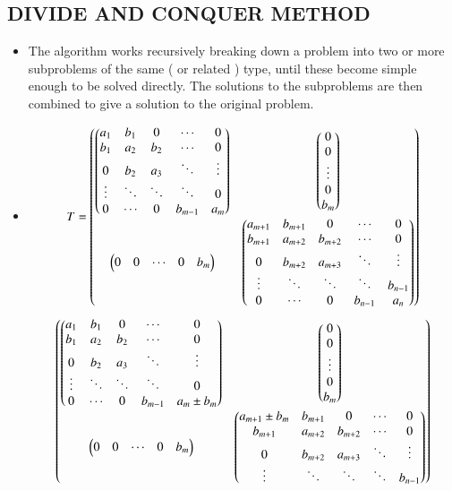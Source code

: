 \documentclass[report,12pt,onecolumn]{IEEEtran}
\theoremstyle{remark}
\begin{document}
\begin{itemize}
		\section{DIVIDE AND CONQUER METHOD}
		\begin{itemize}
			\item The algorithm works recursively breaking down a problem into two or more subproblems of the same ( or related ) type, until these become simple enough to be solved directly. The solutions to the subproblems are then combined to give a solution to the original problem.
			\item $$ T = \begin{pmatrix}\begin{pmatrix}a_1 & b_1 & 0 & \cdots & 0 \\
b_1 & a_2 & b_2 & \cdots & 0 \\
0 & b_2 & a_3 & \ddots & \vdots \\
\vdots & \ddots & \ddots & \ddots & 0 \\
				0 & \cdots & 0 & b_{m-1} & a_m\end{pmatrix} & \begin{pmatrix}0 \\ 0 \\ \vdots \\ 0 \\ b_m\end{pmatrix} \\ \begin{pmatrix}0 & 0 & \cdots & 0 & b_m\end{pmatrix} & \begin{pmatrix}a_{m+1} & b_{m+1} & 0 & \cdots & 0 \\
b_{m+1} & a_{m+2} & b_{m+2} & \cdots & 0 \\
0 & b_{m+2} & a_{m+3} & \ddots & \vdots \\
\vdots & \ddots & \ddots & \ddots & b_{n-1} \\
				0 & \cdots & 0 & b_{n-1} & a_n\end{pmatrix}\end{pmatrix} $$
				$$ \begin{pmatrix}\begin{pmatrix}a_1 & b_1 & 0 & \cdots & 0 \\
b_1 & a_2 & b_2 & \cdots & 0 \\
0 & b_2 & a_3 & \ddots & \vdots \\
\vdots & \ddots & \ddots & \ddots & 0 \\
				0 & \cdots & 0 & b_{m-1} & a_m \pm b_m\end{pmatrix} & \begin{pmatrix}0 \\ 0 \\ \vdots \\ 0 \\ b_m\end{pmatrix} \\ \begin{pmatrix}0 & 0 & \cdots & 0 & b_m\end{pmatrix} & \begin{pmatrix}a_{m+1} \pm b_m & b_{m+1} & 0 & \cdots & 0 \\
b_{m+1} & a_{m+2} & b_{m+2} & \cdots & 0 \\
0 & b_{m+2} & a_{m+3} & \ddots & \vdots \\
\vdots & \ddots & \ddots & \ddots & b_{n-1} \\
\end{pmatrix}\end{pmatrix}$$
\end{itemize}
\end{itemize}
\end{document}
